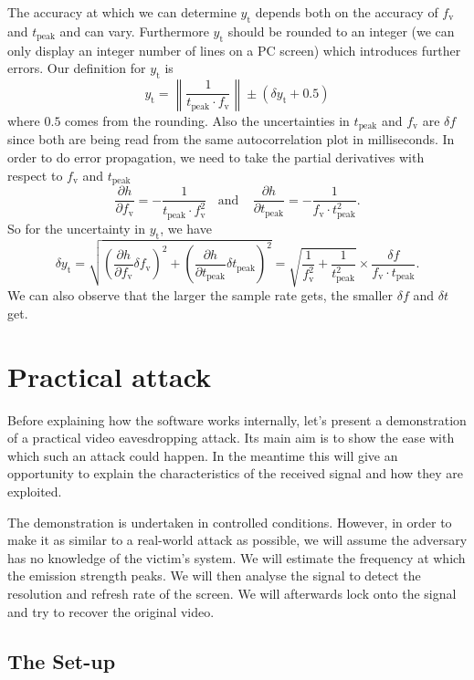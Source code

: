 \documentclass[a4paper,12pt,twoside,openright]{report}
\begin{document}
The accuracy at which we can determine $y_\text{t}$ depends both on the accuracy of $f_\text{v}$ and $t_\text{peak}$ and can vary. Furthermore $y_\text{t}$ should be rounded to an integer (we can only display an integer number of lines on a PC screen) which introduces further errors. Our definition for $y_\text{t}$ is
$$y_\text{t} = \left\| \frac{1}{t_\text{peak} \cdot f_\text{v}} \right\| \pm (\delta y_\text{t} + 0.5)$$
where $0.5$ comes from the rounding. Also the uncertainties in $t_\text{peak}$ and $f_\text{v}$ are $\delta f$ since both are being read from the same autocorrelation plot in milliseconds. In order to do error propagation, we need to take the partial derivatives with respect to $f_\text{v}$ and $t_\text{peak}$
$$\frac{\partial h}{\partial f_\text{v}} = - \frac{1}{t_\text{peak} \cdot f_\text{v}^2}
 \,\,\,\,\ \text{and} \,\,\,\,\ \
\frac{\partial h}{\partial t_\text{peak}} = - \frac{1}{f_\text{v} \cdot t_\text{peak}^2} .$$
So for the uncertainty in $y_\text{t}$, we have
$$\delta y_\text{t} =
\sqrt{\left( \frac{\partial h}{\partial f_\text{v}} \delta f_\text{v} \right)^2 + \left( \frac{\partial h}{\partial t_\text{peak}} \delta t_\text{peak} \right)^2} = 
\sqrt{\frac{1}{f_\text{v}^2} + \frac{1}{t_\text{peak}^2}} \times \frac{\delta f}{f_\text{v} \cdot t_\text{peak}} .$$
We can also observe that the larger the sample rate gets, the smaller $\delta f$ and $\delta t$ get.

\chapter{Practical attack} 
\label{chap:practical}

Before explaining how the software works internally, let's present a demonstration of a practical video eavesdropping attack. Its main aim is to show the ease with which such an attack could happen. In the meantime this will give an opportunity to explain the characteristics of the received signal and how they are exploited.

The demonstration is undertaken in controlled conditions. However, in order to make it as similar to a real-world attack as possible, we will assume the adversary has no knowledge of the victim's system. We will estimate the frequency at which the emission strength peaks. We will then analyse the signal to detect the resolution and refresh rate of the screen. We will afterwards lock onto the signal and try to recover the original video.

\section{The Set-up}
\end{document}
